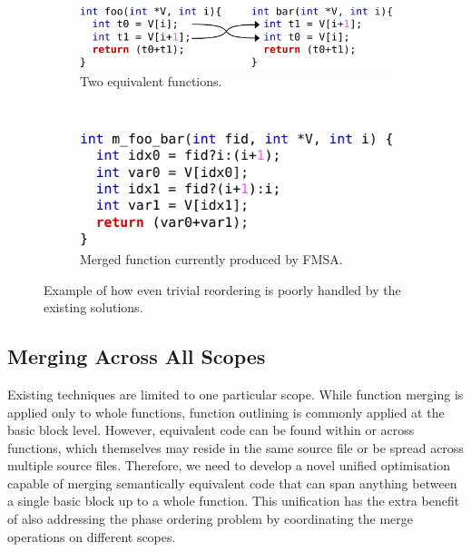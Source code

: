\begin{figure}[h]
 \centering
 \begin{subfigure}{.75\textwidth}
         \centering
         \includegraphics[scale=1]{src/conclusion/figs/motivation-1-code.pdf}
         \caption{Two equivalent functions.}
         \label{fig:code-reordering}
 \end{subfigure}
 \\
 \begin{subfigure}{.75\textwidth}
         \centering
         \includegraphics[scale=1]{src/conclusion/figs/motivation-1-merged-code.pdf}
         \caption{Merged function currently produced by FMSA.}
         \label{fig:merged-code-reordering}
 \end{subfigure}
    \vspace{-2ex}
    \caption{Example of how even trivial reordering is poorly handled by the existing solutions.}
    \label{fig:code-reordering-example}
\end{figure}

\subsection{Merging Across All Scopes}

Existing techniques are limited to one particular scope.
While function merging is applied only to whole functions,
function outlining is commonly applied at the basic block level.
However, equivalent code can be found within or across functions, which themselves may reside in the same source file or be spread across multiple source files.
Therefore, we need to develop a novel unified optimisation capable of merging semantically equivalent code that can span anything between a single basic block up to a whole function.
This unification has the extra benefit of also addressing the phase ordering problem by coordinating the merge operations on different scopes.

